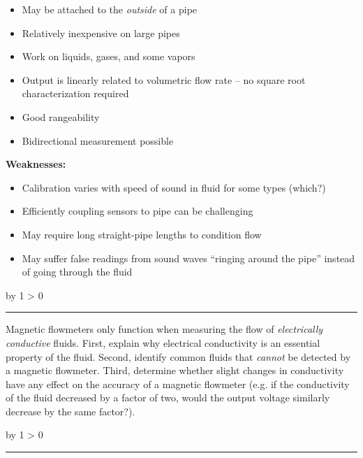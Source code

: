 \documentclass[12pt,a4paper]{article}
\def\oppgave{
            \advance\questnum by 1
            \ifnum \questnum > 0
                 \hrule
                 \vskip 3pt
                 \leftline{Oppgave \the\questnum}
                 \vskip 3pt \fi}
\begin{document}
\begin{itemize}
\item{} May be attached to the {\it outside} of a pipe
\item{} Relatively inexpensive on large pipes
\item{} Work on liquids, gases, and some vapors
\item{} Output is linearly related to volumetric flow rate -- no square root characterization required
\item{} Good rangeability
\item{} Bidirectional measurement possible
\end{itemize}

\vskip 10pt

{\bf Weaknesses:}

\begin{itemize}
\item{} Calibration varies with speed of sound in fluid for some types (which?)
\item{} Efficiently coupling sensors to pipe can be challenging
\item{} May require long straight-pipe lengths to condition flow
\item{} May suffer false readings from sound waves ``ringing around the pipe'' instead of going through the fluid
\end{itemize}

\vskip 10pt \filbreak 
\oppgave{} 

Magnetic flowmeters only function when measuring the flow of {\it electrically conductive} fluids.  First, explain why electrical conductivity is an essential property of the fluid.  Second, identify common fluids that {\it cannot} be detected by a magnetic flowmeter.  Third, determine whether slight changes in conductivity have any effect on the accuracy of a magnetic flowmeter (e.g. if the conductivity of the fluid decreased by a factor of two, would the output voltage similarly decrease by the same factor?).

\vskip 10pt \filbreak 
\oppgave{} 
\end{document}
